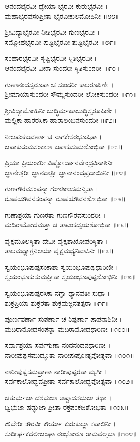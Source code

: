 ಆನಂದಭೈರವೀ ಧ್ಯೇಯಾ ಭೈರವೀ ಕುರುಭೈರವೀ ।\\
ಮಹಾಭೈರವಸಂಪ್ರೀತಾ ಭೈರವೀಕುಲಮೋಹಿನೀ ॥೮೮॥

ಶ್ರೀವಿದ್ಯಾಭೈರವೀ ನೀತಿಭೈರವೀ ಗುಣಭೈರವೀ ।\\
ಸಮ್ಮೋಹಭೈರವೀ ಪುಷ್ಟಿಭೈರವೀ ತುಷ್ಟಿಭೈರವೀ ॥೮೯॥

ಸಂಹಾರಭೈರವೀ ಸೃಷ್ಟಿಭೈರವೀ ಸ್ಥಿತಿಭೈರವೀ ।\\
ಆನಂದಭೈರವೀ ವೀರಾ ಸುಂದರೀ ಸ್ಥಿತಿಸುಂದರೀ ॥೯೦॥

ಗುಣಾನಂದಸ್ವರೂಪಾ ಚ ಸುಂದರೀ ಕಾಲರೂಪಿಣೀ ।\\
ಶ್ರೀಮಾಯಾಸುಂದರೀ ಸೌಮ್ಯಸುಂದರೀ ಲೋಕಸುಂದರೀ ॥೯೧॥

ಶ್ರೀವಿದ್ಯಾಮೋಹಿನೀ ಬುದ್ಧಿರ್ಮಹಾಬುದ್ಧಿಸ್ವರೂಪಿಣೀ ।\\
ಮಲ್ಲಿಕಾ ಹಾರರಸಿಕಾ ಹಾರಾಲಂಬನಸುಂದರೀ ॥೯೨॥

ನೀಲಪಂಕಜವರ್ಣಾ ಚ ನಾಗಕೇಸರಭೂಷಿತಾ ।\\
ಜಪಾಕುಸುಮಸಂಕಾಶಾ ಜಪಾಕುಸುಮಶೋಭಿತಾ ॥೯೩॥

ಪ್ರಿಯಾ ಪ್ರಿಯಂಕರೀ ವಿಷ್ಣೋರ್ದಾನವೇಂದ್ರವಿನಾಶಿನೀ ।\\
ಜ್ಞಾನೇಶ್ವರೀ ಜ್ಞಾನದಾತ್ರೀ ಜ್ಞಾನಾನಂದಪ್ರದಾಯಿನೀ ॥೯೪॥

ಗುಣಗೌರವಸಂಪನ್ನಾ ಗುಣಶೀಲಸಮನ್ವಿತಾ ।\\
ರೂಪಯೌವನಸಂಪನ್ನಾ ರೂಪಯೌವನಶೋಭಿತಾ ॥೯೫॥

ಗುಣಾಶ್ರಯಾ ಗುಣರತಾ ಗುಣಗೌರವಸುಂದರೀ ।\\
ಮದಿರಾಮೋದಮತ್ತಾ ಚ ತಾಟಂಕದ್ವಯಶೋಭಿತಾ ॥೯೬॥

ವೃಕ್ಷಮೂಲಸ್ಥಿತಾ ದೇವೀ ವೃಕ್ಷಶಾಖೋಪರಿಸ್ಥಿತಾ ।\\
ತಾಲಮಧ್ಯಾಗ್ರನಿಲಯಾ ವೃಕ್ಷಮಧ್ಯನಿವಾಸಿನೀ ॥೯೭॥

ಸ್ವಯಂಭೂಪುಷ್ಪಸಂಕಾಶಾ ಸ್ವಯಂಭೂಪುಷ್ಪಧಾರಿಣೀ ।\\
ಸ್ವಯಂಭೂಕುಸುಮಪ್ರೀತಾ ಸ್ವಯಂಭೂಪುಷ್ಪಶೋಭಿನೀ ॥೯೮॥

ಸ್ವಯಂಭೂಪುಷ್ಪರಸಿಕಾ ನಗ್ನಾ ಧ್ಯಾನವತೀ ಸುಧಾ ।\\
ಶುಕ್ರಪ್ರಿಯಾ ಶುಕ್ರರತಾ ಶುಕ್ರಮಜ್ಜನತತ್ಪರಾ ॥೯೯॥

ಪೂರ್ಣಪರ್ಣಾ ಸುಪರ್ಣಾ ಚ ನಿಷ್ಪರ್ಣಾ ಪಾಪನಾಶಿನೀ ।\\
ಮದಿರಾಮೋದಸಂಪನ್ನಾ ಮದಿರಾಮೋದಧಾರಿಣೀ ॥೧೦೦॥

ಸರ್ವಾಶ್ರಯಾ ಸರ್ವಗುಣಾ ನಂದನಂದನಧಾರಿಣೀ ।\\
ನಾರೀಪುಷ್ಪಸಮುದ್ಭೂತಾ ನಾರೀಪುಷ್ಪೋತ್ಸವೋತ್ಸವಾ ॥೧೦೧॥

ನಾರೀಪುಷ್ಪಸಮಪ್ರಾಣಾ ನಾರೀಪುಷ್ಪರತಾ ಮೃಗೀ ।\\
ಸರ್ವಕಾಲೋದ್ಭವಪ್ರೀತಾ ಸರ್ವಕಾಲೋದ್ಭವೋತ್ಸವಾ ॥೧೦೨॥

ಚತುರ್ಭುಜಾ ದಶಭುಜಾ ಅಷ್ಟಾದಶಭುಜಾ ತಥಾ ।\\
ದ್ವಿಭುಜಾ ಷಡ್ಭುಜಾ ಪ್ರೀತಾ ರಕ್ತಪಂಕಜಶೋಭಿತಾ ॥೧೦೩॥

ಕೌಬೇರೀ ಕೌರವೀ ಕೌರ್ಯಾ ಕುರುಕುಲ್ಲಾ ಕಪಾಲಿನೀ ।\\
ಸುದೀರ್ಘಕದಲೀಜಂಘಾ ರಂಭೋರೂ ರಾಮವಲ್ಲಭಾ ॥೧೦೪॥

